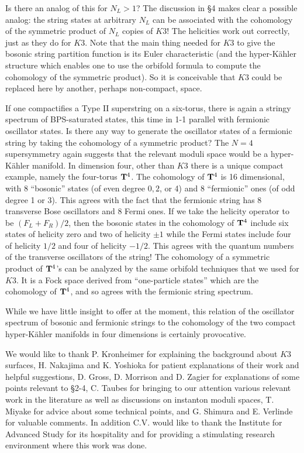 \documentclass[12pt]{article}
\numberwithin{equation}{section}
\begin{document}
Is there an analog of this for $N_L>1$?
The discussion in  \S4 makes clear a possible
analog: the string states at arbitrary $N_L$
can be associated with the cohomology of the symmetric product
of $N_L$ copies of $K3$!
The helicities work out correctly, just as they do for $K3$.
Note that the main thing needed for $K3$ to give the
bosonic string partition function is its Euler characteristic
(and the hyper-K\"ahler structure which enables one to use the orbifold
formula to compute the cohomology of the symmetric product).
So it is conceivable that $K3$ could be replaced here by another,
perhaps non-compact, space.

If one compactifies a Type II superstring on a six-torus,
there is again a stringy spectrum of BPS-saturated states,
this time in 1-1 parallel with fermionic oscillator states.
Is there any way to generate the oscillator states of a fermionic
string by taking the cohomology of a symmetric product?
The $N=4$ supersymmetry again suggests that the relevant moduli
space would be a hyper-K\"ahler manifold.  In dimension four,
other than $K3$ there is a unique compact example, namely the
four-torus ${\bf T}^4$.
The cohomology of ${\bf T}^4$ is 16 dimensional, with 8 ``bosonic''
states (of even degree $0,2$, or 4) and 8 ``fermionic'' ones
(of odd degree 1 or 3).
This agrees with the fact that the fermionic string has 8 transverse
Bose oscillators and 8 Fermi ones.  If we take the helicity operator
to be $(F_L+F_R)/2$, then the bosonic states in the cohomology of ${\bf T}^4$
include six states of helicity zero and two of helicity $\pm 1$
while the Fermi states include four of helicity $1/2$ and four of helicity
$-1/2$.  This agrees with the quantum numbers of the transverse oscillators
of the string!
The cohomology of a symmetric product of ${\bf T}^4$'s can be analyzed
by the same orbifold techniques that we used for $K3$. It is a Fock
space derived from ``one-particle states'' which are the cohomology of
${\bf T}^4$, and so agrees with the fermionic string spectrum.

While we have little insight to offer at the moment, this relation of
the oscillator spectrum of bosonic and fermionic strings to
the cohomology of the two compact hyper-K\"ahler manifolds in four
dimensions is certainly provocative.

\bigskip
{}
We would like to thank P. Kronheimer for explaining the background about $K3$
surfaces, H. Nakajima and K. Yoshioka
for patient explanations of their work and helpful suggestions,
D. Gross, D. Morrison and D. Zagier for
explanations of some points relevant to \S2-4,
C. Taubes for bringing to our attention various relevant work
in the literature as well
as discussions on instanton moduli spaces,  T. Miyake for advice
about some technical points, and G. Shimura
and E. Verlinde for valuable comments.
In addition C.V. would like to thank
the Institute for Advanced Study for its hospitality and
for providing a stimulating research environment
where this work was done.
\end{document}
